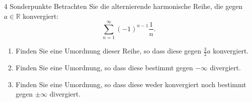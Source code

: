 \documentclass{../problemset}
\begin{document}
\begin{problem}{4 Sonderpunkte}
Betrachten Sie die alternierende harmonische Reihe, die gegen $a \in \mathbb{R}$ konvergiert:
\[
	\sum_{n=1}^{\infty} (-1)^{n-1}\frac{1}{n}.
\]
\begin{enumerate}
	\item Finden Sie eine Umordnung dieser Reihe, so dass diese gegen $\frac{3}{2}a$ konvergiert.
	\item Finden Sie eine Umordnung, so dass diese bestimmt gegen $-\infty$ divergiert.
	\item Finden Sie eine Umordnung, so dass diese weder konvergiert noch bestimmt gegen $\pm\infty$ divergiert.
\end{enumerate}
\end{problem}
\end{document}
